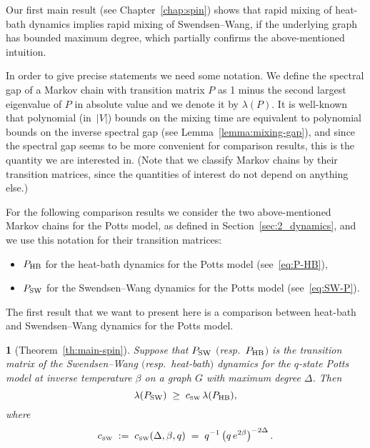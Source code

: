 \documentclass{dis}
\theoremstyle{citing}
\newtheorem{cit}{}
\begin{document}
Our first main result (see Chapter~\ref{chap:spin}) 
shows that rapid mixing of heat-bath dynamics 
implies rapid mixing of Swendsen--Wang, 
if the underlying graph has bounded maximum degree, 
which partially confirms the above-mentioned intuition.

In order to give precise statements  
we need some notation.
We define the spectral gap of a Markov chain with 
transition matrix $P$ as 1 minus the second largest eigenvalue 
of $P$ in absolute value and we denote it by $\lambda(P)$. 
It is well-known that polynomial (in~${\left\vert {V} \right\vert}$) bounds on the 
mixing time are equivalent to polynomial bounds on the inverse 
spectral gap (see Lemma~\ref{lemma:mixing-gap}), 
and since the spectral gap seems to be more convenient for 
comparison results, this is the quantity we are interested in. 
(Note that we classify Markov chains by their transition 
matrices, since the quantities of interest do not depend on 
anything else.)

For the following comparison results we consider the two 
above-mentioned Markov chains for the Potts model, 
as defined in Section~\ref{sec:2_dynamics}, 
and we use this notation 
for their transition matrices:
\begin{itemize}
	\item ${P_{\rm HB}}$ for the heat-bath dynamics for the Potts model 
					(see~\eqref{eq:P-HB}), \vspace{2mm}
	\item ${P_{\rm SW}}$ for the Swendsen--Wang dynamics for the Potts model 
					(see~\eqref{eq:SW-P}).
\end{itemize} 
The first result that we want to present here is a comparison 
between heat-bath and Swendsen--Wang dynamics for the Potts model. 

\vspace{2mm}

\begin{cit}[Theorem~\ref{th:main-spin}] 
Suppose that ${P_{\rm SW}}$ $($resp.~${P_{\rm HB}}$$)$ is the transition matrix of the 
Swendsen--Wang $($resp.~heat-bath$)$ dynamics for the $q$-state Potts 
model at inverse temperature $\beta$ on a graph $G$ with 
maximum degree ${\Delta}$. 
Then
\[
\lambda({P_{\rm SW}}) \;\ge\; {c_{\text{\rm\tiny SW}}}\,\lambda({P_{\rm HB}}),
\]
where
\begin{equation}
{c_{\text{\rm\tiny SW}}} \;:=\; {c_{\text{\rm\tiny SW}}}({\Delta},\beta,q) 
\;=\; q^{-1}\left(q\,e^{2\beta}\right)^{-2{\Delta}}.
\end{equation}
\vspace{-3mm}
\end{cit}
\end{document}

